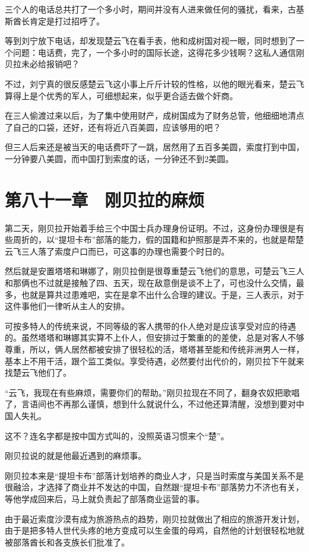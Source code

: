 三个人的电话总共打了一个多小时，期间并没有人进来做任何的骚扰，看来，古基斯酋长肯定是打过招呼了。

等到刘宁放下电话，却发现楚云飞在看手表，他和成树国对视一眼，同时想到了一个问题：电话费，完了，一个多小时的国际长途，这得花多少钱啊？这私人通信刚贝拉未必给报销吧？

不过，刘宁真的很反感楚云飞这小事上斤斤计较的性格，以他的眼光看来，楚云飞算得上是个优秀的军人，可细想起来，似乎更合适去做个奸商。

在三人偷渡过来以后，为了集中使用财产，成树国成为了财务总管，他细细地清点了自己的口袋，还好，还有将近八百美圆，应该够用的吧？

但三人后来还是被当天的电话费吓了一跳，居然用了五百多美圆，索度打到中国，一分钟要八美圆，而中国打到索度的话，一分钟还不到2美圆。

\section{第八十一章　刚贝拉的麻烦}

第二天，刚贝拉开始着手给三个中国士兵办理身份证明。不过，这身份办理很是有些周折的，以“提坦卡布”部落的能力，假的国籍和护照那是弄不来的，也就是帮楚云飞三人落了索度户口而已，可这事的办理也需要个时日的。

然后就是安置塔塔和琳娜了，刚贝拉倒是很尊重楚云飞他们的意思，可楚云飞三人和那俩也不过就是接触了四、五天，现在敌意倒是谈不上了，可也没什么交情，最多，也就是算共过患难吧，实在是拿不出什么合理的建议。于是，三人表示，对于这件事他们一律听从主人的安排。

可按多特人的传统来说，不同等级的客人携带的仆人绝对是应该享受对应的待遇的。虽然塔塔和琳娜其实算不上仆人，但安排过于繁重的的差使，总是对客人不够尊重，所以，俩人居然都被安排了很轻松的活，塔塔甚至能和传统非洲男人一样，基本上不用干活，跟个监工类似。享受待遇，必然要付出代价的，刚贝拉下午就来找楚云飞他们了。

“云飞，我现在有些麻烦，需要你们的帮助。”刚贝拉现在不同了，翻身农奴把歌唱了，言语间也不再那么谨慎，想到什么就说什么，不过他还算清醒，没想到要对中国人失礼。

这不？连名字都是按中国方式叫的，没照英语习惯来个“楚”。

刚贝拉说的就是他最近遇到的麻烦事。

刚贝拉本来是“提坦卡布”部落计划培养的商业人才，只是当时索度与美国关系不是很融洽，才选择了商业并不发达的中国，自然跟“提坦卡布”部落势力不济也有关，等他学成回来后，马上就负责起了部落商业运营的事。

由于最近索度沙漠有成为旅游热点的趋势，刚贝拉就做出了相应的旅游开发计划，由于是把多特人世代头疼的地方变成可以生金蛋的母鸡，自然他的计划很轻松地就被部落酋长和各支族长们批准了。

